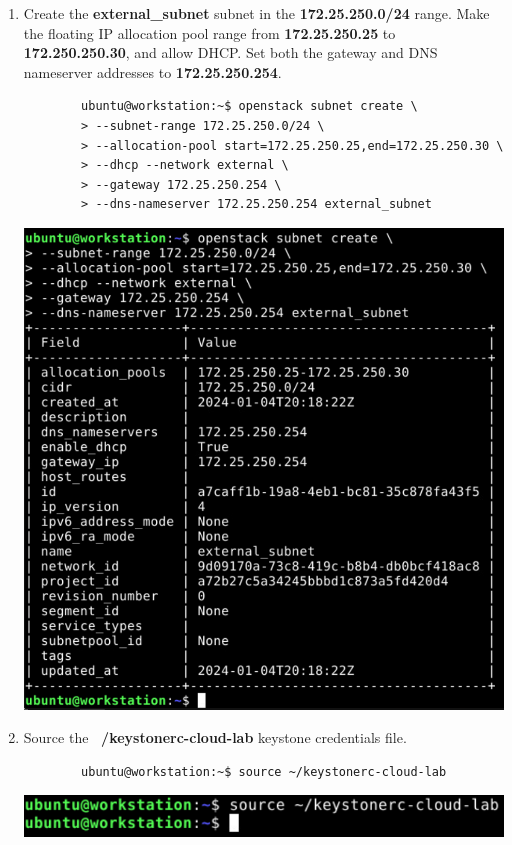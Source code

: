\documentclass[letterpaper, 12pt]{article}
\begin{document}
\begin{enumerate}
    \item Create the \textbf{external\_subnet} subnet in the \textbf{172.25.250.0/24} range. Make the floating IP
    allocation pool range from \textbf{172.25.250.25} to \textbf{172.250.250.30}, and allow DHCP. Set both the gateway
    and DNS nameserver addresses to \textbf{172.25.250.254}.
    \begin{lstlisting}
        ubuntu@workstation:~$ openstack subnet create \
        > --subnet-range 172.25.250.0/24 \
        > --allocation-pool start=172.25.250.25,end=172.25.250.30 \
        > --dhcp --network external \
        > --gateway 172.25.250.254 \
        > --dns-nameserver 172.25.250.254 external_subnet
    \end{lstlisting}

    \begin{center}
        \includegraphics[width=\linewidth]{images/part1/step19.png}
    \end{center}

    \item Source the \textbf{~/keystonerc-cloud-lab} keystone credentials file.
    \begin{lstlisting}
        ubuntu@workstation:~$ source ~/keystonerc-cloud-lab
    \end{lstlisting}

    \begin{center}
        \includegraphics[width=\linewidth]{images/part1/step20.png}
    \end{center}


\end{enumerate}
\end{document}
